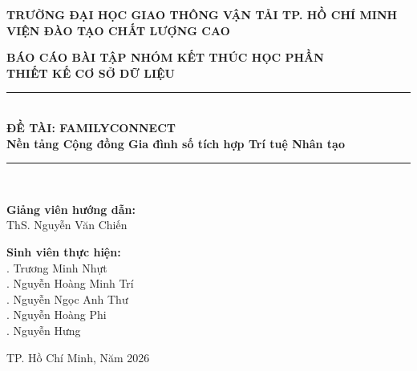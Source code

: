 \documentclass[12pt,a4paper,oneside]{report}
\theoremstyle{definition}
\begin{document}
\hypersetup{pageanchor=false}
\begin{titlepage}
\begin{center}
    \large\textbf{TRƯỜNG ĐẠI HỌC GIAO THÔNG VẬN TẢI TP. HỒ CHÍ MINH}\\
    \textbf{VIỆN ĐÀO TẠO CHẤT LƯỢNG CAO}\\[1.5cm]

    \vspace*{1.5cm}

    \Large\textbf{BÁO CÁO BÀI TẬP NHÓM KẾT THÚC HỌC PHẦN}\\[0.5cm]
    \Huge\textbf{THIẾT KẾ CƠ SỞ DỮ LIỆU}\\[1.5cm]

    \rule{\linewidth}{1.5pt}\\[0.4cm]
    \LARGE\textbf{ĐỀ TÀI: FAMILYCONNECT}\\[0.2cm]
    \large\textbf{Nền tảng Cộng đồng Gia đình số tích hợp Trí tuệ Nhân tạo}\\
    \rule{\linewidth}{1.5pt}\\[2cm]

    \begin{minipage}[t]{0.45\textwidth}
        \textbf{Giảng viên hướng dẫn:}\\
        \indent ThS. Nguyễn Văn Chiến
    \end{minipage}
    \begin{minipage}[t]{0.5\textwidth}
        \textbf{Sinh viên thực hiện:}\\
        . Trương Minh Nhựt\\
        . Nguyễn Hoàng Minh Trí\\
        . Nguyễn Ngọc Anh Thư\\
        . Nguyễn Hoàng Phi\\
        . Nguyễn Hưng
    \end{minipage}

    \vfill
    {\large TP. Hồ Chí Minh, Năm 2026}
\end{center}
\end{titlepage}
\hypersetup{pageanchor=true}

{}
\tableofcontents
\newpage
{}
{}
\listoffigures
\newpage
{}
{}
\listoftables
\newpage
\end{document}
